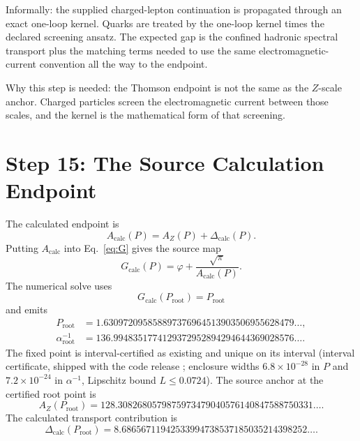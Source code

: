 \documentclass[11pt]{article}
\theoremstyle{remark}
\newcommand{\alphainv}{\alpha^{-1}}
\newcommand{\AZ}{A_Z}
\newcommand{\Dcalc}{\Delta_{\mathrm{calc}}}
\begin{document}
Informally: the supplied charged-lepton continuation is propagated through an
exact one-loop kernel. Quarks are treated by the one-loop kernel times the
declared screening ansatz. The expected gap is the confined hadronic spectral
transport plus the matching terms needed to use the same electromagnetic-current convention all the way to the endpoint.

Why this step is needed: the Thomson endpoint is not the same as the \(Z\)-scale anchor. Charged particles screen the electromagnetic current between those scales, and the kernel is the mathematical form of that screening.

\section{Step 15: The Source Calculation Endpoint}

The calculated endpoint is
\begin{equation}
A_{\mathrm{calc}}(P)
=
\AZ(P)+\Dcalc(P).
\label{eq:Acalc}
\end{equation}
Putting \(A_{\mathrm{calc}}\) into Eq.~\eqref{eq:G} gives the source map
\begin{equation}
G_{\mathrm{calc}}(P)
=
\varphi+\frac{\sqrt\pi}{A_{\mathrm{calc}}(P)}.
\label{eq:Gcalc}
\end{equation}
The numerical solve uses
\begin{equation}
G_{\mathrm{calc}}(P_{\mathrm{root}})=P_{\mathrm{root}}
\label{eq:Proot}
\end{equation}
and emits
\begin{align}
P_{\mathrm{root}}
&=
1.630972095858897376964513903506955628479\ldots,
\label{eq:Prootnum}\\
\alphainv_{\mathrm{root}}
&=
136.9948351774129372952894294644369028576\ldots.
\label{eq:alpharoot}
\end{align}
The fixed point is interval-certified as
existing and unique on its interval (interval certificate,
shipped with the code release \cite{oph-code};
enclosure widths \(6.8\times10^{-28}\) in \(P\) and \(7.2\times10^{-24}\) in
\(\alpha^{-1}\), Lipschitz bound \(L\le0.0724\)).
The source anchor at the certified root point is
\begin{equation}
\AZ(P_{\mathrm{root}})
=
128.3082680579875973479040576140847588750331\ldots.
\label{eq:AZroot}
\end{equation}
The calculated transport contribution is
\begin{equation}
\Dcalc(P_{\mathrm{root}})
=
8.68656711942533994738537185035214398252\ldots.
\label{eq:Dcalcroot}
\end{equation}
\end{document}
